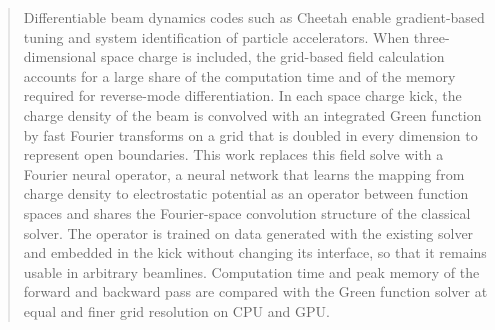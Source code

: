 %
%


\begin{abstract}
Differentiable beam dynamics codes such as Cheetah enable gradient-based
tuning and system identification of particle accelerators. When
three-dimensional space charge is included, the grid-based field
calculation accounts for a large share of the computation time and of the
memory required for reverse-mode differentiation. In each space charge
kick, the
charge density of the beam is convolved with an integrated Green function
by fast Fourier transforms on a grid that is doubled in every dimension to
represent open boundaries. This work replaces this field solve with a
Fourier neural operator, a neural network that learns the mapping from
charge density to electrostatic potential as an operator between function
spaces and shares the Fourier-space convolution structure of the classical
solver. The operator is trained on data generated with the existing solver
and embedded in the kick without changing its interface, so that it remains
usable in arbitrary beamlines. Computation time and peak memory of the
forward and backward pass are compared with the Green function solver at
equal and finer grid resolution on CPU and GPU.  
\end{abstract}


